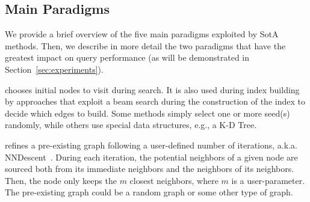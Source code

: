 \subsection{Main Paradigms}

We provide a brief overview of the five main paradigms exploited by SotA methods.
Then, we describe in more detail the two  paradigms that have the greatest impact on query performance (as will be demonstrated in Section~\ref{sec:experiments}).

 chooses initial nodes to visit during search. It is also used during index building by approaches that exploit a beam search during the construction of the index to decide which edges to build. Some methods simply select one or more seed(s) randomly, while others use special data structures, e.g., a K-D Tree.


 refines a pre-existing graph following a user-defined number of iterations, a.k.a. NNDescent~\cite{nndescent}. 
During each iteration, the potential neighbors of a given node are sourced both from its immediate neighbors and the neighbors of its neighbors. Then, the node only keeps the $m$ closest neighbors, where $m$ is a user-parameter. %
The pre-existing graph could be a random graph 
or some other type of graph.


